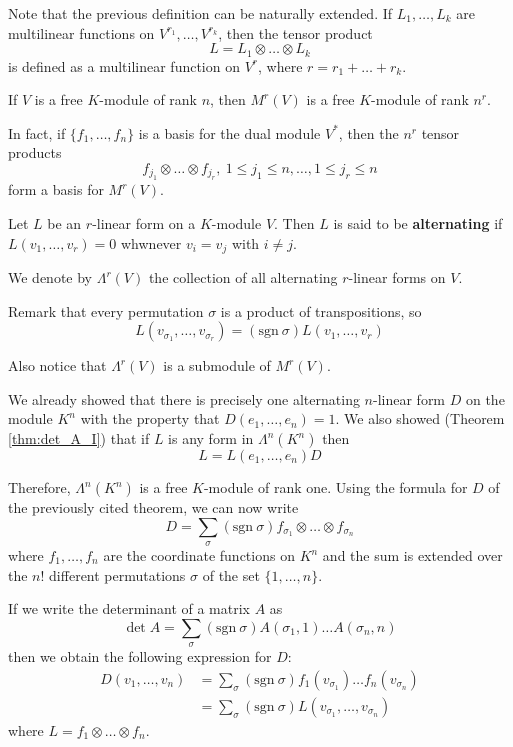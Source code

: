 Note that the previous definition can be naturally extended. If $L_1, \ldots, L_k$ are multilinear functions on $V^{r_1}, \ldots, V^{r_k}$, then the tensor product
\[
	L = L_1 \otimes \ldots \otimes L_k
\]
is defined as a multilinear function on $V^r$, where $r = r_1 + \ldots + r_k$.

\begin{theorem}
	If $V$ is a free $K$-module of rank $n$, then $M^r(V)$ is a free $K$-module of rank $n^r$.
	
	In fact, if $\{ f_1, \ldots, f_n \}$ is a basis for the dual module $V^\ast$, then the $n^r$ tensor products
	\[
		f_{j_1} \otimes \ldots \otimes f_{j_r}, ~1 \leq j_1 \leq n, \ldots, 1 \leq j_r \leq n
	\]
	form a basis for $M^r(V)$.
\end{theorem}

\begin{definition}
	Let $L$ be an $r$-linear form on a $K$-module $V$. Then $L$ is said to be \textbf{alternating} if $L(v_1, \ldots, v_r) = 0$ whwnever $v_i = v_j$ with $i \neq j$.
	
	We denote by $\Lambda^r(V)$ the collection of all alternating $r$-linear forms on $V$.
\end{definition}

Remark that every permutation $\sigma$ is a product of transpositions, so
\[
	L(v_{\sigma_1}, \ldots, v_{\sigma_r}) = (\text{sgn}~\sigma) L(v_1, \ldots, v_r)
\]

Also notice that $\Lambda^r(V)$ is a submodule of $M^r(V)$.

\begin{remark}
	We already showed that there is precisely one alternating $n$-linear form $D$ on the module $K^n$ with the property that $D(e_1, \ldots, e_n) = 1$. We also showed (Theorem \ref{thm:det_A_I}) that if $L$ is any form in $\Lambda^n(K^n)$ then
	\[
		L = L(e_1, \ldots, e_n)D
	\]
	
	Therefore, $\Lambda^n(K^n)$ is a free $K$-module of rank one. Using the formula for $D$ of the previously cited theorem, we can now write
	\[
		D = \sum_\sigma (\text{sgn}~\sigma) f_{\sigma_1} \otimes \ldots \otimes f_{\sigma_n}
	\]
	where $f_1, \ldots, f_n$ are the coordinate functions on $K^n$ and the sum is extended over the $n!$ different permutations $\sigma$ of the set $\{ 1, \ldots, n \}$.
	
	If we write the determinant of a matrix $A$ as
	\[
		\det A = \sum_\sigma (\text{sgn}~\sigma) A(\sigma_1, 1) \ldots A(\sigma_n, n)
	\]
	then we obtain the following expression for $D$:
	\begin{equation*}
		\begin{aligned}
			D(v_1, \ldots, v_n) &= \sum_\sigma (\text{sgn}~\sigma) f_1(v_{\sigma_1}) \ldots f_n(v_{\sigma_n}) \\
			&= \sum_\sigma (\text{sgn}~\sigma) L(v_{\sigma_1}, \ldots, v_{\sigma_n})
		\end{aligned}
	\end{equation*}
	where $L = f_1 \otimes \ldots \otimes f_n$.
\end{remark}


